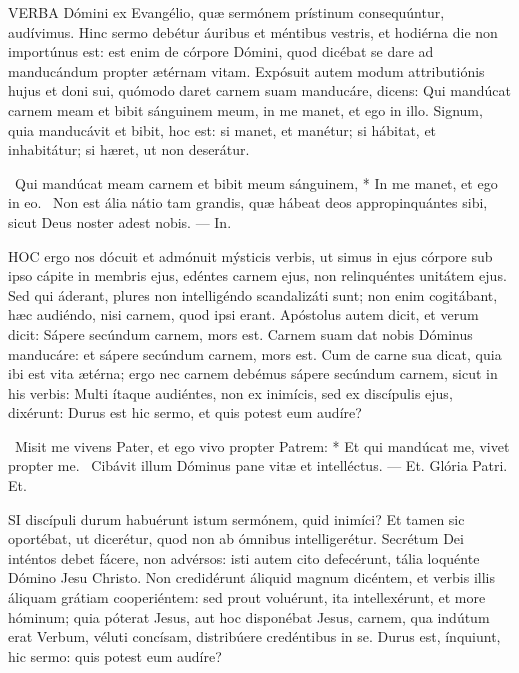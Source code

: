 

\lettrine[lines=2]{V}{ERBA} Dómini ex Evangélio, quæ sermónem prístinum consequúntur, audívimus. Hinc sermo debétur áuribus et méntibus vestris, et hodiérna die non importúnus est: est enim de córpore Dómini, quod dicébat se dare ad manducándum propter ætérnam vitam. Expósuit autem modum attributiónis hujus et doni sui, quómodo daret carnem suam manducáre, dicens: Qui mandúcat carnem meam et bibit sánguinem meum, in me manet, et ego in illo. Signum, quia manducávit et bibit, hoc est: si manet, et manétur; si hábitat, et inhabitátur; si hæret, ut non deserátur.

\R\ Qui mandúcat meam carnem et bibit meum sánguinem, * In me manet, et ego in eo. \V\ Non est ália nátio tam grandis, quæ hábeat deos appropinquántes sibi, sicut Deus noster adest nobis. --- In.


\lettrine[lines=2]{H}{OC} ergo nos dócuit et admónuit mýsticis verbis, ut simus in ejus córpore sub ipso cápite in membris ejus, edéntes carnem ejus, non relinquéntes unitátem ejus. Sed qui áderant, plures non intelligéndo scandalizáti sunt; non enim cogitábant, hæc audiéndo, nisi carnem, quod ipsi erant. Apóstolus autem dicit, et verum dicit: Sápere secúndum carnem, mors est. Carnem suam dat nobis Dóminus manducáre: et sápere secúndum carnem, mors est. Cum de carne sua dicat, quia ibi est vita ætérna; ergo nec carnem debémus sápere secúndum carnem, sicut in his verbis: Multi ítaque audiéntes, non ex inimícis, sed ex discípulis ejus, dixérunt: Durus est hic sermo, et quis potest eum audíre?

\R\ Misit me vivens Pater, et ego vivo propter Patrem: * Et qui mandúcat me, vivet propter me. \V\ Cibávit illum Dóminus pane vitæ et intelléctus. --- Et. Glória Patri. Et.


\lettrine[lines=2]{S}{I} discípuli durum habuérunt istum sermónem, quid inimíci? Et tamen sic oportébat, ut dicerétur, quod non ab ómnibus intelligerétur. Secrétum Dei inténtos debet fácere, non advérsos: isti autem cito defecérunt, tália loquénte Dómino Jesu Christo. Non credidérunt áliquid magnum dicéntem, et verbis illis áliquam grátiam cooperiéntem: sed prout voluérunt, ita intellexérunt, et more hóminum; quia póterat Jesus, aut hoc disponébat Jesus, carnem, qua indútum erat Verbum, véluti concísam, distribúere credéntibus in se. Durus est, ínquiunt, hic sermo: quis potest eum audíre?

